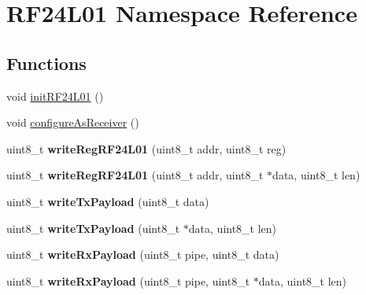 \hypertarget{namespace_r_f24_l01}{}\section{R\+F24\+L01 Namespace Reference}
\label{namespace_r_f24_l01}
\subsection*{Functions}
\begin{DoxyCompactItemize}
\item 
void \mbox{\hyperlink{namespace_r_f24_l01_ad724bae93ed3edb7ba1c151d4bdf9f49}{init\+R\+F24\+L01}} ()
\item 
void \mbox{\hyperlink{namespace_r_f24_l01_ac6a39c4cfff9cf552bb772a264cc9a8c}{configure\+As\+Receiver}} ()
\item 
\mbox{\label{namespace_r_f24_l01_ab0bc62ba53046f6fe8863c5da7a51fa6}} 
uint8\+\_\+t {\bfseries write\+Reg\+R\+F24\+L01} (uint8\+\_\+t addr, uint8\+\_\+t reg)
\item 
\mbox{\label{namespace_r_f24_l01_a7dee6717f0de2a925073efb2b79bf06c}} 
uint8\+\_\+t {\bfseries write\+Reg\+R\+F24\+L01} (uint8\+\_\+t addr, uint8\+\_\+t $\ast$data, uint8\+\_\+t len)
\item 
\mbox{\label{namespace_r_f24_l01_ae4ee83d91afe7383f4b59be46b98cdac}} 
uint8\+\_\+t {\bfseries write\+Tx\+Payload} (uint8\+\_\+t data)
\item 
\mbox{\label{namespace_r_f24_l01_a3fc764c93b418aa1aa0f554246833120}} 
uint8\+\_\+t {\bfseries write\+Tx\+Payload} (uint8\+\_\+t $\ast$data, uint8\+\_\+t len)
\item 
\mbox{\label{namespace_r_f24_l01_afd6323c961aa6d9555de2b898f530d4c}} 
uint8\+\_\+t {\bfseries write\+Rx\+Payload} (uint8\+\_\+t pipe, uint8\+\_\+t data)
\item 
\mbox{\label{namespace_r_f24_l01_a0a8b783cf43290cd146a5a5a6e39b850}} 
uint8\+\_\+t {\bfseries write\+Rx\+Payload} (uint8\+\_\+t pipe, uint8\+\_\+t $\ast$data, uint8\+\_\+t len)
\item 
\mbox{\label{namespace_r_f24_l01_af59c2d84f32e7a38468b0f526cd4144b}} 

\end{DoxyCompactItemize}
